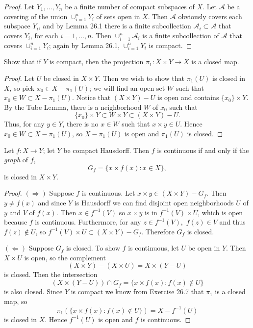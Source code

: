 \documentclass[11pt]{article}
\begin{document}
\begin{proof}
  Let $Y_1,\ldots,Y_n$ be a finite number of compact subspaces of $X$. Let
  $\mathcal{A}$ be a covering of the union $\cup_{i=1}^n Y_i$ of sets open in
  $X$. Then $\mathcal{A}$ obviously covers each subspace $Y_i$, and by Lemma
  26.1 there is a finite subcollection $\mathcal{A}_i \subset \mathcal{A}$ that
  covers $Y_i$, for each $i=1,\ldots,n$. Then $\cup_{i=1}^n \mathcal{A}_i$ is a
  finite subcollection of $\mathcal{A}$ that covers $\cup_{i=1}^n Y_i$;
  again by Lemma 26.1, $\cup_{i=1}^n Y_i$ is compact.
\end{proof}

\begin{ex}{26.7}
  Show that if $Y$ is compact, then the projection $\pi_1 : X \times Y \to X$ is
  a closed map.
\end{ex}

\begin{proof}
  Let $U$ be closed in $X \times Y$. Then we wish to show that $\pi_1(U)$ is
  closed in $X$, so pick $x_0 \in X - \pi_1(U)$; we will find an open set $W$
  such that $x_0 \in W \subset X - \pi_1(U)$. Notice that $(X \times Y) - U$ is
  open and contains $\{x_0\} \times Y$. By the Tube Lemma, there is a
  neighborhood $W$ of $x_0$ such that
  \[ \{x_0\} \times Y \subset W \times Y \subset (X \times Y) - U. \]
  Thus, for any $y \in Y$, there is no $x \in W$ such that $x \times y \in U$.
  Hence $x_0 \in W \subset X - \pi_1(U)$, so $X - \pi_1(U)$ is open and
  $\pi_1(U)$ is closed.
\end{proof}

\begin{ex}{26.8}
  Let $f: X \to Y$; let $Y$ be compact Hausdorff. Then $f$ is continuous if and
  only if the \emph{graph} of $f$,
  \[ G_f = \{x \times f(x) : x \in X\},\]
  is closed in $X \times Y$.
\end{ex}

\begin{proof}
  $(\Longrightarrow)$ Suppose $f$ is continuous. Let $x \times y \in (X \times
  Y) - G_f$. Then $y \neq f(x)$ and since $Y$ is Hausdorff we can find disjoint open
  neighborhoods $U$ of $y$ and $V$ of $f(x)$. Then $x \in f^{-1}(V)$ so
  $x \times y$ is in $f^{-1}(V) \times U$, which is open because $f$ is
  continuous. Furthermore, for any $z \in f^{-1}(V),$ $f(z) \in V$ and thus
  $f(z) \not\in U$, so $f^{-1}(V) \times U \subset (X \times Y) - G_f.$
  Therefore $G_f$ is closed.

  $(\Longleftarrow)$ Suppose $G_f$ is closed. To show $f$ is continuous, let $U$
  be open in $Y$. Then $X \times U$ is open, so the complement
  \[(X \times Y) - (X \times U) = X \times (Y - U) \]
  is closed. Then the intersection
  \[ (X \times (Y-U)) \cap G_f = \{x \times f(x): f(x) \not\in U\} \]
  is also closed. Since $Y$ is compact we know from Exercise 26.7 that $\pi_1$ is a
  closed map, so
  \[ \pi_1(\{x \times f(x): f(x) \not\in U\}) = X - f^{-1}(U) \]
  is closed in $X$. Hence $f^{-1}(U)$ is open and $f$ is continuous.

\end{proof}
\end{document}
